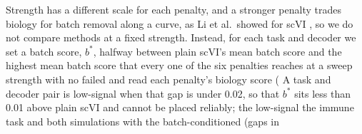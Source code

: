 \documentclass[10pt]{article}
\begin{document}
\qquad Strength has a different scale for each penalty, and a stronger penalty trades biology for batch removal along a curve, as Li et al.\ showed for scVI \citep{li2022trade}, so we do not compare methods at a fixed strength. Instead, for each task and decoder we set a batch score, $b^*$, halfway between plain scVI's mean batch score and the highest mean batch score that every one of the six penalties reaches at a sweep strength with no failed  and read each penalty's biology score  ( A task and decoder pair is low-signal when that gap is under 0.02, so that $b^*$ sits less than 0.01 above plain scVI and cannot be placed reliably;  the low-signal  the immune task and both simulations with the batch-conditioned  (gaps in 
\end{document}
